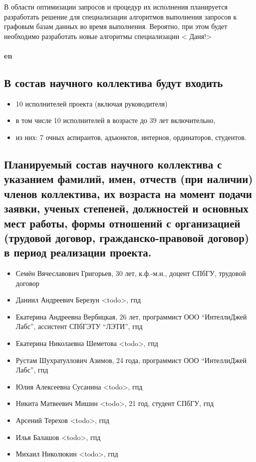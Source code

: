 \documentclass[12pt]{article}  %
\theoremstyle{remark}
\begin{document}
В области оптимизации запросов и процедур их исполнения планируется разработать решение для специализации алгоритмов выполнения запросов к графовым базам данных во время выполнения. Вероятно, при этом будет необходимо разработать новые алгоритмы специализации
{\huge< Даня!>}
\\
\\
\textbf{en}\\

\subsection{В состав научного коллектива будут входить}
%
\begin{itemize}
\item 10 исполнителей проекта (включая руководителя)
\item в том числе 10  исполнителей в возрасте до 39 лет включительно,
\item из них: 7 очных аспирантов, адъюнктов, интернов, ординаторов, студентов.
\end{itemize}

\subsection{Планируемый состав научного коллектива с указанием фамилий, имен, отчеств (при наличии) членов коллектива, их возраста на момент подачи заявки, ученых степеней, должностей и основных мест работы, формы отношений с организацией (трудовой договор, гражданско-правовой договор) в период реализации проекта.}

\begin{itemize}
  \item Семён Вячеславович Григорьев, 30 лет, к.ф.-м.н., доцент СПбГУ, трудовой договор
  \item Даниил Андреевич Березун {\huge<todo>}, гпд
  \item Екатерина Андреевна Вербицкая, 26 лет, программист ООО ``ИнтеллиДжей Лабс'', ассистент СПбГЭТУ ``ЛЭТИ'', гпд
  \item Екатерина Николаевна Шеметова {\huge<todo>}, гпд
  \item Рустам Шухратуллович Азимов, 24 года, программист ООО ``ИнтеллиДжей Лабс'', гпд
  \item Юлия Алексеевна Сусанина {\huge<todo>}, гпд
  \item Никита Матвеевич Мишин {\huge<todo>}, 21 год, студент СПбГУ, гпд
  \item Арсений Терехов {\huge<todo>}, гпд
  \item Илья Балашов {\huge<todo>}, гпд
  \item Михаил Николюкин {\huge<todo>}, гпд
\end{itemize}
\end{document}
